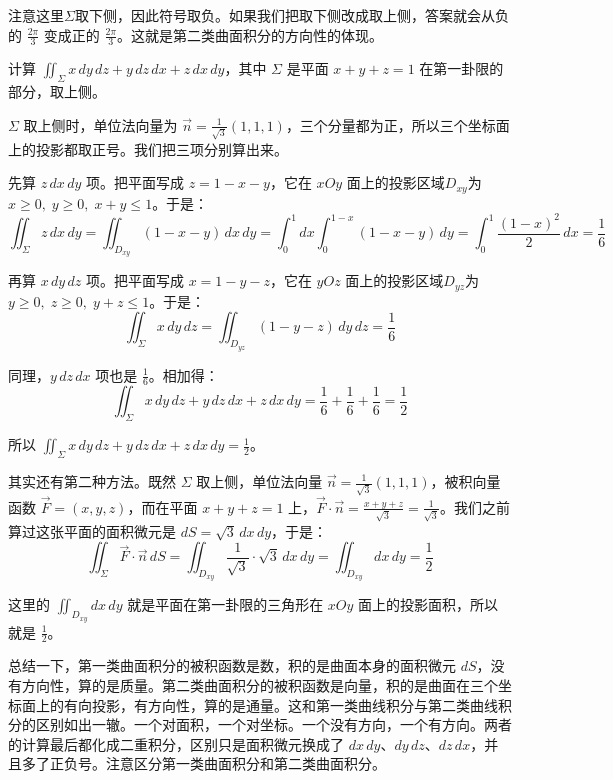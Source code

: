 注意这里\(\Sigma\)取下侧，因此符号取负。如果我们把取下侧改成取上侧，答案就会从负的 \(\frac{2\pi}{3}\) 变成正的 \(\frac{2\pi}{3}\)。这就是第二类曲面积分的方向性的体现。

\begin{myexample}
计算 \(\iint_{\Sigma} x\,dy\,dz + y\,dz\,dx + z\,dx\,dy\)，其中 \(\Sigma\) 是平面 \(x+y+z=1\) 在第一卦限的部分，取上侧。

\(\Sigma\) 取上侧时，单位法向量为 \(\vec{n}=\frac{1}{\sqrt{3}}(1,1,1)\)，三个分量都为正，所以三个坐标面上的投影都取正号。我们把三项分别算出来。

先算 \(z\,dx\,dy\) 项。把平面写成 \(z=1-x-y\)，它在 \(xOy\) 面上的投影区域\(D_{xy}\)为\(x\ge 0,\;y\ge 0,\;x+y\le 1\)。于是：
\[
\iint_{\Sigma} z\,dx\,dy = \iint_{D_{xy}} (1-x-y)\,dx\,dy
= \int_0^1 dx \int_0^{1-x} (1-x-y)\,dy
= \int_0^1 \frac{(1-x)^2}{2}\,dx = \frac16
\]

再算 \(x\,dy\,dz\) 项。把平面写成 \(x=1-y-z\)，它在 \(yOz\) 面上的投影区域\(D_{yz}\)为\(y\ge 0,\;z\ge 0,\;y+z\le 1\)。于是：
\[
\iint_{\Sigma} x\,dy\,dz = \iint_{D_{yz}} (1-y-z)\,dy\,dz = \frac16
\]

同理，\(y\,dz\,dx\) 项也是 \(\frac16\)。相加得：
\[
\iint_{\Sigma} x\,dy\,dz + y\,dz\,dx + z\,dx\,dy = \frac16+\frac16+\frac16 = \frac12
\]

所以 \(\iint_{\Sigma} x\,dy\,dz + y\,dz\,dx + z\,dx\,dy = \frac12\)。

其实还有第二种方法。既然 \(\Sigma\) 取上侧，单位法向量 \(\vec{n}=\frac{1}{\sqrt{3}}(1,1,1)\)，被积向量函数 \(\vec{F}=(x,y,z)\)，而在平面 \(x+y+z=1\) 上，\(\vec{F}\cdot\vec{n}=\frac{x+y+z}{\sqrt{3}}=\frac{1}{\sqrt{3}}\)。我们之前算过这张平面的面积微元是 \(dS=\sqrt{3}\,dx\,dy\)，于是：
\[
\iint_{\Sigma} \vec{F}\cdot\vec{n}\,dS = \iint_{D_{xy}} \frac{1}{\sqrt{3}}\cdot\sqrt{3}\,dx\,dy = \iint_{D_{xy}} dx\,dy = \frac12
\]

这里的 \(\iint_{D_{xy}} dx\,dy\) 就是平面在第一卦限的三角形在 \(xOy\) 面上的投影面积，所以就是 \(\frac12\)。
\end{myexample}

总结一下，第一类曲面积分的被积函数是数，积的是曲面本身的面积微元 \(dS\)，没有方向性，算的是质量。第二类曲面积分的被积函数是向量，积的是曲面在三个坐标面上的有向投影，有方向性，算的是通量。这和第一类曲线积分与第二类曲线积分的区别如出一辙。一个对面积，一个对坐标。一个没有方向，一个有方向。两者的计算最后都化成二重积分，区别只是面积微元换成了 \(dx\,dy\)、\(dy\,dz\)、\(dz\,dx\)，并且多了正负号。注意区分第一类曲面积分和第二类曲面积分。

